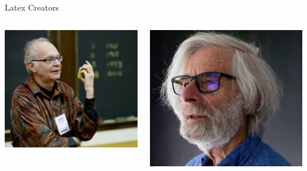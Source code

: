 \begin{frame}{Latex Creators}
    \begin{columns}
        \begin{column}{0.6\textwidth}
            \includegraphics[width=0.7\linewidth]{figs/knuth}
        \end{column}
        
        \begin{column}{0.4\textwidth}
            \includegraphics[width=0.9\linewidth]{figs/Lamport}
        \end{column}
    \end{columns}
\end{frame}



